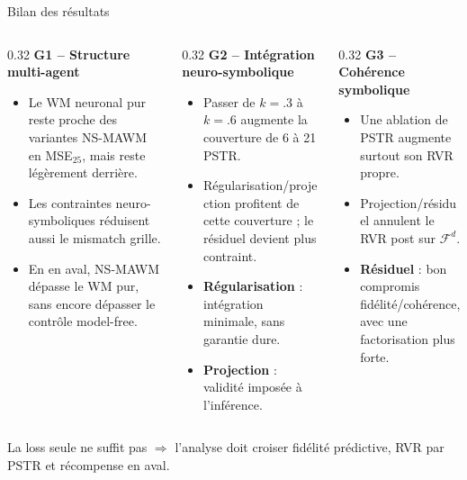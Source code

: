 \documentclass[aspectratio=169]{beamer}
\begin{document}
\begin{frame}{Bilan des résultats}
  \scriptsize
  \begin{columns}[T,totalwidth=\textwidth]
    \begin{column}{0.32\textwidth}
      \textbf{G1 -- Structure multi-agent}

      \vspace{0.03cm}
      \begin{itemize}
        \setlength{\itemsep}{0.12em}
        \item Le WM neuronal pur reste proche des variantes NS-MAWM en MSE$_{25}$,
              mais reste légèrement derrière.
        \item Les contraintes neuro-symboliques réduisent aussi le mismatch grille.
        \item En en aval, NS-MAWM dépasse le WM pur, sans encore dépasser le
              contrôle model-free.
      \end{itemize}
    \end{column}

    \begin{column}{0.32\textwidth}
      \textbf{G2 -- Intégration neuro-symbolique}

      \vspace{0.03cm}
      \begin{itemize}
        \setlength{\itemsep}{0.12em}
        \item Passer de $k=.3$ à $k=.6$ augmente la couverture de 6 à 21 PSTR.
        \item Régularisation/projection profitent de cette couverture ;
              le résiduel devient plus contraint.
        \item \textbf{Régularisation} : intégration minimale, sans garantie dure.
        \item \textbf{Projection} : validité imposée à l'inférence.
      \end{itemize}
    \end{column}

    \begin{column}{0.32\textwidth}
      \textbf{G3 -- Cohérence symbolique}

      \vspace{0.03cm}
      \begin{itemize}
        \setlength{\itemsep}{0.12em}
        \item Une ablation de PSTR augmente surtout son RVR propre.
        \item Projection/résiduel annulent le RVR post sur $\mathcal{F}^d$.
        \item \textbf{Résiduel} : bon compromis fidélité/cohérence, avec une
              factorisation plus forte.
      \end{itemize}
    \end{column}
  \end{columns}

  \vspace{0.5cm}
  La loss seule ne suffit pas $\Rightarrow$ l'analyse doit croiser fidélité prédictive,
  RVR par PSTR et récompense en aval.
\end{frame}
\end{document}
